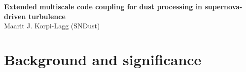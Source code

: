 \documentclass[a4paper,12pt]{article}
\begin{document}
%
\textbf{\LARGE{Extended multiscale code coupling for dust processing in supernova-driven turbulence}}\\
%
Maarit J. Korpi-Lagg (SNDust)


\section{Background and significance}
\end{document}
